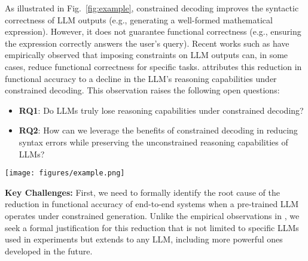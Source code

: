 \noindent As illustrated in Fig.~\ref{fig:example}, constrained decoding improves the syntactic correctness of LLM outputs (e.g., generating a well-formed mathematical expression). 
However, it does not guarantee functional correctness (e.g., ensuring the expression correctly answers the user's query). 
Recent works such as \citet{speakFree} have empirically observed that imposing constraints on LLM outputs can, in some cases, reduce functional correctness for specific tasks. 
\citet{speakFree} attributes this reduction in functional accuracy to a decline in the LLM's reasoning capabilities under constrained decoding. 
This observation  raises the following open questions:
\begin{itemize}[noitemsep, nolistsep, leftmargin=*]
    \item \textbf{RQ1}: Do LLMs truly lose reasoning capabilities under constrained decoding?
    \item \textbf{RQ2}: How can we leverage the benefits of constrained decoding in reducing syntax errors while preserving the unconstrained reasoning capabilities of LLMs? 
\end{itemize}
\begin{figure*}[t] %
    \centering
    \texttt{[image: figures/example.png]} %
    \caption{An example from the GSM-symbolic dataset (variables in blue) where unconstrained generation produces syntactically incorrect output, while constrained generation provides a syntactically valid but incorrect answer. \Tool, however, generates a correct answer.}
    \label{fig:example} %
\end{figure*}

\textbf{Key Challenges:} First, we need to formally identify the root cause of the reduction in functional accuracy of end-to-end systems when a pre-trained LLM operates under constrained generation. 
Unlike the empirical observations in \cite{speakFree}, we seek a formal justification for this reduction that is not limited to specific LLMs used in experiments but extends to any LLM, including more powerful ones developed in the future.

